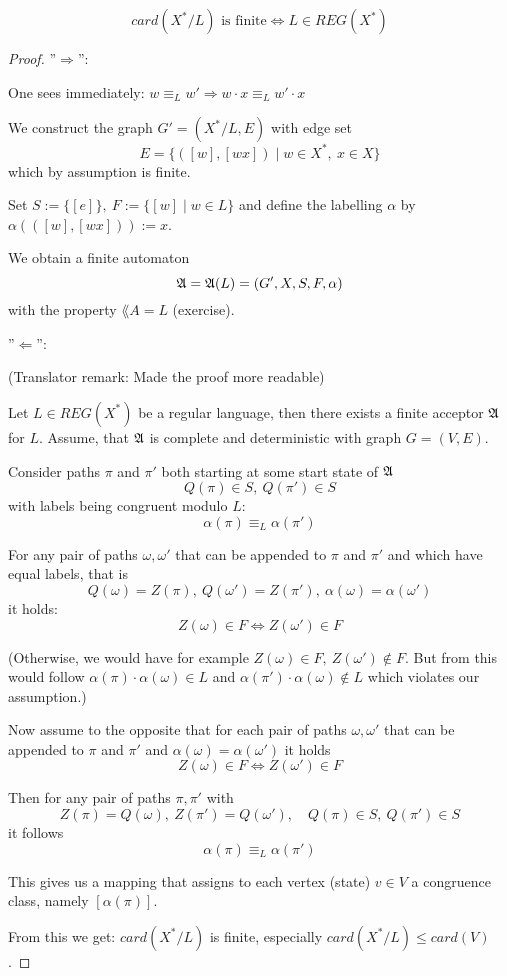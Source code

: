 \begin{lemma}
\[ card(X^*/L) \mbox{ is finite} \iff L \in REG(X^*) \]
\end{lemma}

\begin{proof}
''$\Rightarrow$'':

One sees immediately: $w \equiv_L w' \Rightarrow w \cdot x \equiv_L w' \cdot x$

We construct the graph $G' = (X^*/L, E)$ with edge set
\[ E = \{ ([w], [wx]) \mid w \in X^*,\ x \in X \} \]
which by assumption is finite.

Set $S := \{ [e] \},\ F := \{[w] \mid w\in L \}$ and define the labelling
$\alpha$ by $\alpha(([w], [wx])) := x$.

We obtain a finite automaton \[ \mbox{$\mathfrak{A}$} = \mbox{$\mathfrak{A}$}(L) = (G', X, S, F, \alpha) \]
with the property $\lang{A} = L$ (exercise).

''$\Leftarrow$'':

(Translator remark: Made the proof more readable)

Let $L \in REG(X^*)$ be a regular language, then there exists a finite acceptor
$\mbox{$\mathfrak{A}$}$ for $L$. Assume, that $\mbox{$\mathfrak{A}$}$ is complete and deterministic with graph
$G = (V, E)$.

Consider paths $\pi$ and $\pi'$ both starting at some start state of $\mbox{$\mathfrak{A}$}$
\[ Q(\pi) \in S,\ Q(\pi')\in S \]
with labels being congruent modulo $L$:
\[ \alpha(\pi) \equiv_L \alpha(\pi') \]

For any pair of paths $\omega, \omega'$ that can be appended to $\pi$ and $\pi'$
and which have equal labels, that is
\[ Q(\omega) = Z(\pi),\ Q(\omega') = Z(\pi'),\ \alpha(\omega) = \alpha(\omega')
\] it holds: \[ Z(\omega) \in F \iff Z(\omega') \in F \]

(Otherwise, we would have for example $Z(\omega) \in F,\ Z(\omega') \notin F$.
But from this would follow $\alpha(\pi) \cdot \alpha(\omega) \in L$ and
$\alpha(\pi') \cdot \alpha(\omega) \notin L$ which violates our assumption.)

Now assume to the opposite that for each pair of paths $\omega,
\omega'$ that can be appended to $\pi$ and $\pi'$ and $\alpha(\omega) =
\alpha(\omega')$ it holds \[ Z(\omega) \in F \iff Z(\omega') \in F \]

Then for any pair of paths $\pi, \pi'$ with 
\[Z(\pi) = Q(\omega),\ Z(\pi') = Q(\omega'),\quad Q(\pi)\in S,\ Q(\pi') \in S \]
it follows 
\[ \alpha(\pi) \equiv_L \alpha(\pi') \]

This gives us a mapping that assigns to each vertex (state) $v \in V$ a
congruence class, namely $[\alpha(\pi)]$.

From this we get: $card(X^*/L)$ is finite, especially $card(X^*/L) \leq
card(V)$.
\end{proof}

